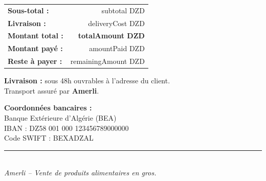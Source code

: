 \documentclass[12pt,a4paper]{article}
\begin{document}
\vspace{0.5cm}

\begin{flushright}
\begin{tabular}{lr}
\textbf{Sous-total :} & {{{subtotal}}} DZD \\
\textbf{Livraison :} & {{{deliveryCost}}} DZD \\
\midrule
\textbf{Montant total :} & \textbf{ {{{totalAmount}}} DZD} \\
\textbf{Montant payé :} & {{{amountPaid}}} DZD \\
\textbf{Reste à payer :} & {{{remainingAmount}}} DZD \\
\end{tabular}
\end{flushright}

\vspace{0.8cm}

\noindent
\textbf{Livraison :} sous 48h ouvrables à l'adresse du client.\\
Transport assuré par \textbf{Amerli}.

\vspace{0.5cm}

\noindent
\textbf{Coordonnées bancaires :}\\
Banque Extérieure d'Algérie (BEA)\\
IBAN : DZ58 001 000 123456789000000\\
Code SWIFT : BEXADZAL

\vfill

\begin{center}
    \rule{0.6\textwidth}{0.4pt}\\
    \textit{Amerli – Vente de produits alimentaires en gros.}
\end{center}
\end{document}
